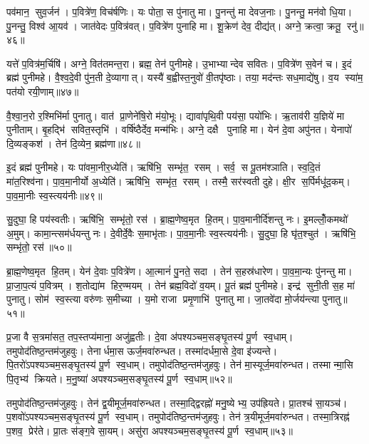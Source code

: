 पव॑मान॒ सुव॒र्जन॑। प॒वित्रे॑ण॒ विच॑र्\mbox{}षणिः। यः पोता॒ स पु॑नातु मा। पु॒नन्तु॑ मा देवज॒नाः। पु॒नन्तु॒ मन॑वो धि॒या। पु॒नन्तु॒ विश्व॑ आ॒यव॑। जात॑वेदः प॒वित्र॑वत्। प॒वित्रे॑ण पुनाहि मा। शू॒क्रेण॑ देव॒ दीद्य॑त्। अग्ने॒ क्रत्वा॒ क्रतू॒ रनु॑॥४६॥

यत्ते॑ प॒वित्र॑म॒र्चिषि॑। अग्ने॒ वित॑तमन्त॒रा। ब्रह्म॒ तेन॑ पुनीमहे। उ॒भाभ्यान्देव सवितः। प॒वित्रे॑ण स॒वेन॑ च। इ॒दं ब्रह्म॑ पुनीमहे। वै॒श्व॒दे॒वी पु॑न॒ती दे॒व्यागात्। यस्यै॑ ब॒ह्वीस्त॒नुवो॑ वी॒तपृ॑ष्ठाः। तया॒ मद॑न्तः सध॒माद्ये॑षु। व॒य स्या॑म॒ पत॑यो रयी॒णाम्॥४७॥

वै॒श्वा॒न॒रो र॒श्मिभि॑र्मा पुनातु। वात॑ प्रा॒णेने॑षि॒रो म॑यो॒भूः। द्यावा॑पृथि॒वी पय॑सा॒ पयो॑भिः। ऋ॒ताव॑री य॒ज्ञिये॑ मा पुनीताम्। बृ॒हद्भि॑ सवित॒स्तृभि॑। वर्\mbox{}षि॑ष्ठैर्देव॒ मन्म॑भिः। अग्ने॒ दक्षै पुनाहि मा। येन॑ दे॒वा अपु॑नत। येनापो॑ दि॒व्यङ्कश॑। तेन॑ दि॒व्येन॒ ब्रह्म॑णा॥४८॥

इ॒दं ब्रह्म॑ पुनीमहे। यः पा॑वमा॒नीर॒ध्येति॑। ऋषि॑भि॒ सम्भृ॑त॒ रसम्। सर्व॒ स पू॒तम॑श्ञाति। स्व॒दि॒तं मा॑त॒रिश्व॑ना। पा॒व॒मा॒नीर्यो अ॒ध्येति॑। ऋषि॑भि॒ सम्भृ॑त॒ रसम्। तस्मै॒ सर॑स्वती दुहे। क्षी॒र स॒र्पिर्मधू॑द॒कम्। पा॒व॒मा॒नीः स्व॒स्त्यय॑नीः॥४९॥

सु॒दुघा॒ हि पय॑स्वतीः। ऋषि॑भि॒ सम्भृ॑तो॒ रस॑। ब्रा॒ह्म॒णेष्व॒मृत हि॒तम्। पा॒व॒मानीर्दि॑शन्तु नः। इ॒मल्लोँ॒कमथो॑ अ॒मुम्। कामा॒न्त्सम॑र्धयन्तु नः। दे॒वीर्दे॒वैः स॒माभृ॑ताः। पा॒व॒मा॒नीः स्व॒स्त्यय॑नीः। सु॒दुघा॒ हि घृ॑त॒श्चुत॑। ऋषि॑भि॒ सम्भृ॑तो॒ रस॑॥५०॥

ब्रा॒ह्म॒णेष्व॒मृत हि॒तम्। येन॑ दे॒वाः प॒वित्रे॑ण। आ॒त्मानं॑ पु॒नते॒ सदा। तेन॑ स॒हस्र॑धारेण। पा॒व॒मा॒न्यः पु॑नन्तु मा। प्रा॒जा॒प॒त्यं प॒वित्रम्। श॒तोद्या॑म हिर॒ण्मयम्। तेन॑ ब्रह्म॒विदो॑ व॒यम्। पू॒तं ब्रह्म॑ पुनीमहे। इन्द्र॑ सुनी॒ती स॒ह मा॑ पुनातु। सोम॑ स्व॒स्त्या वरु॑णः स॒मीच्या। य॒मो राजा प्रमृ॒णाभि॑ पुनातु मा। जा॒तवे॑दा मो॒र्जय॑न्त्या पुनातु॥५१॥\anuvakamend[अनु॑ रयी॒णां ब्रह्म॑णा स्व॒स्त्यय॑नीः सु॒दुघा॒ हि घृ॑त॒श्चुत॒ ऋषि॑भि॒ सम्भृ॑तो॒ रस॑ पुनातु॒ त्रीणि॑ च]

प्र॒जा वै स॒त्रमा॑सत॒ तप॒स्तप्य॑माना॒ अजु॑ह्वतीः। दे॒वा अ॑पश्यञ्चम॒सङ्घृ॒तस्य॑ पू॒र्ण स्व॒धाम्। तमुपोद॑तिष्ठ॒न्तम॑जुहवुः। तेनार्धमा॒स ऊर्ज॒मवा॑रुन्धत। तस्मा॑दर्धमा॒से दे॒वा इ॑ज्यन्ते। पि॒तरो॑ऽपश्यञ्चम॒सङ्घृ॒तस्य॑ पू॒र्ण स्व॒धाम्। तमुपोद॑तिष्ठ॒न्तम॑जुहवुः। तेन॑ मा॒स्यूर्ज॒मवा॑रुन्धत। तस्मान्मा॒सि पि॒तृभ्य॑ क्रियते। म॒नु॒ष्या॑ अपश्यञ्चम॒सङ्घृ॒तस्य॑ पू॒र्ण स्व॒धाम्॥५२॥

तमुपोद॑तिष्ठ॒न्तम॑जुहवुः। तेन॑ द्व॒यीमूर्ज॒मवा॑रुन्धत। तस्मा॒द्द्विरह्नो॑ मनु॒ष्येभ्य॒ उप॑ह्रियते। प्रा॒तश्च॑ सा॒यञ्च॑। प॒शवो॑ऽपश्यञ्चम॒सङ्घृ॒तस्य॑ पू॒र्ण स्व॒धाम्। तमुपोद॑तिष्ठ॒न्त\-म॑जुहवुः। तेन॑ त्र॒यीमूर्ज॒मवा॑रुन्धत। तस्मा॒त्रिरह्न॑ प॒शव॒ प्रेर॑ते। प्रा॒तः स॑ङ्ग॒वे सा॒यम्। असु॑रा अपश्यञ्चम॒सङ्घृ॒तस्य॑ पू॒र्ण स्व॒धाम्॥५३॥

